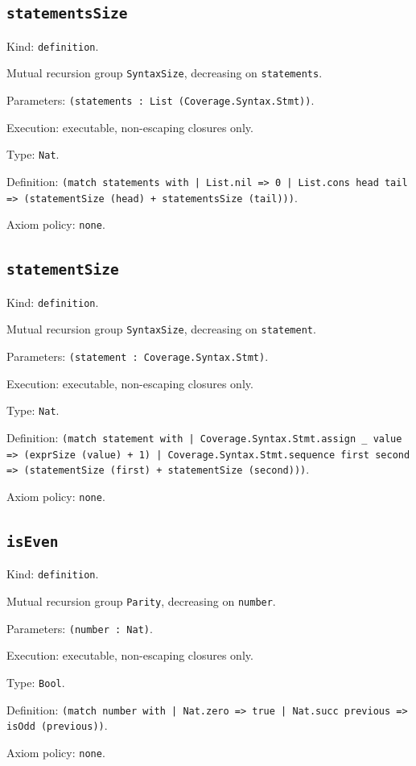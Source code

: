 \documentclass[11pt]{article}
\begin{document}
\subsection*{\texttt{statementsSize}}
\noindent Kind: \texttt{definition}.\par
\noindent Mutual recursion group \texttt{SyntaxSize}, decreasing on \texttt{statements}.\par
\noindent Parameters: \texttt{(statements : List (Coverage.Syntax.Stmt))}.\par
\noindent Execution: executable, non-escaping closures only.\par
\noindent Type: \texttt{Nat}.\par
\noindent Definition: \texttt{(match statements with | List.nil => 0 | List.cons head tail => (statementSize (head) + statementsSize (tail)))}.\par
\noindent Axiom policy: \texttt{none}.\par
\subsection*{\texttt{statementSize}}
\noindent Kind: \texttt{definition}.\par
\noindent Mutual recursion group \texttt{SyntaxSize}, decreasing on \texttt{statement}.\par
\noindent Parameters: \texttt{(statement : Coverage.Syntax.Stmt)}.\par
\noindent Execution: executable, non-escaping closures only.\par
\noindent Type: \texttt{Nat}.\par
\noindent Definition: \texttt{(match statement with | Coverage.Syntax.Stmt.assign \_ value => (exprSize (value) + 1) | Coverage.Syntax.Stmt.sequence first second => (statementSize (first) + statementSize (second)))}.\par
\noindent Axiom policy: \texttt{none}.\par
\subsection*{\texttt{isEven}}
\noindent Kind: \texttt{definition}.\par
\noindent Mutual recursion group \texttt{Parity}, decreasing on \texttt{number}.\par
\noindent Parameters: \texttt{(number : Nat)}.\par
\noindent Execution: executable, non-escaping closures only.\par
\noindent Type: \texttt{Bool}.\par
\noindent Definition: \texttt{(match number with | Nat.zero => true | Nat.succ previous => isOdd (previous))}.\par
\noindent Axiom policy: \texttt{none}.\par
\end{document}
